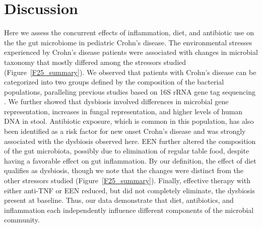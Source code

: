 \section{ Discussion }
Here we assess the concurrent effects of inflammation, diet, and antibiotic use on the the gut microbiome in pediatric Crohn's disease. The environmental stresses experienced by Crohn's disease patients were associated with changes in microbial taxonomy that mostly differed among the stressors studied (Figure~\ref{F25_summary}). We observed that patients with Crohn's disease can be categorized into two groups defined by the composition of the bacterial populations, paralleling previous studies based on 16S rRNA gene tag sequencing \citep{Frank:2007hn,gevers2014treatment,Tong:2013bp}. We further showed that dysbiosis involved differences in microbial gene representation, increases in fungal representation, and higher levels of human DNA in stool. Antibiotic exposure, which is common in this population, has also been identified as a risk factor for new onset Crohn's disease \citep{Card:2004tb, Margolis:2010et} and was strongly associated with the dysbiosis observed here. EEN further altered the composition of the gut microbiota, possibly due to elimination of regular table food, despite having a favorable effect on gut inflammation. By our definition, the effect of diet qualifies as dysbiosis, though we note that the changes were distinct from the other stressors studied (Figure~\ref{F25_summary}). Finally, effective therapy with either anti-TNF or EEN reduced, but did not completely eliminate, the dysbiosis present at baseline. Thus, our data demonstrate that diet, antibiotics, and inflammation each independently influence different components of the microbial community. 



